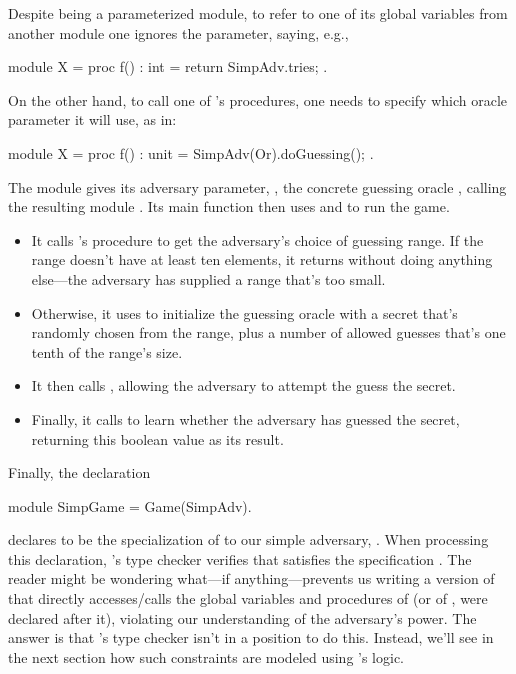 Despite  being a parameterized module, to refer to one
of its global variables from another module one ignores the parameter,
saying, e.g.,
\begin{easycrypt}{}{}
module X = {
  proc f() : int = {
    return SimpAdv.tries;
  }
}.
\end{easycrypt}
On the other hand, to call one of 's procedures, one needs
to specify which oracle parameter it will use, as in:
\begin{easycrypt}{}{}
module X = {
  proc f() : unit = {
    SimpAdv(Or).doGuessing();
  }
}.
\end{easycrypt}

The module  gives its adversary parameter, , the
concrete guessing oracle , calling the resulting module . Its
main function then uses  and  to run the game.
\begin{itemize}
\item It calls 's  procedure to get the adversary's
  choice of guessing range. If the range doesn't have at least ten elements,
  it returns  without doing anything else---the adversary
  has supplied a range that's too small.

\item Otherwise, it uses  to initialize the guessing
  oracle with a secret that's randomly chosen from the range, plus a
  number of allowed guesses that's one tenth of the range's size.

\item It then calls , allowing the adversary to
  attempt the guess the secret.

\item Finally, it calls  to learn whether the
  adversary has guessed the secret, returning this boolean
  value as its result.
\end{itemize}

Finally, the declaration
\begin{easycrypt}{}{}
module SimpGame = Game(SimpAdv).
\end{easycrypt}
declares  to be the specialization of  to
our simple adversary, . When processing this declaration,
\EasyCrypt's type checker verifies that  satisfies
the specification .
The reader might be wondering what---if anything---prevents us writing
a version of  that directly accesses/calls the global
variables and procedures of  (or of , were 
declared after it), violating our understanding of the adversary's
power. The answer is that \EasyCrypt's type checker isn't in a position
to do this. Instead, we'll see in the next section how such
constraints are modeled using \EasyCrypt's logic.

